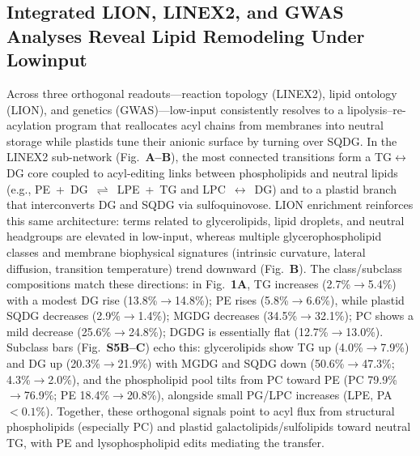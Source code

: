 \documentclass[10pt,letterpaper]{article}
\begin{document}
\subsection*{}




\subsection*{Integrated LION, LINEX2, and GWAS Analyses Reveal Lipid Remodeling Under Lowinput}

Across three orthogonal readouts—reaction topology (LINEX2), lipid ontology (LION), and genetics (GWAS)—low-input consistently resolves to a lipolysis–re-acylation program that reallocates acyl chains from membranes into neutral storage while plastids tune their anionic surface by turning over SQDG. In the LINEX2 sub-network (Fig.\ \textbf{A–B}), the most connected transitions form a TG$\leftrightarrow$DG core coupled to acyl-editing links between phospholipids and neutral lipids (e.g., \mbox{PE + DG $\rightleftharpoons$ LPE + TG} and \mbox{LPC $\leftrightarrow$ DG}) and to a plastid branch that interconverts DG and SQDG via sulfoquinovose. LION enrichment reinforces this same architecture: terms related to glycerolipids, lipid droplets, and neutral headgroups are elevated in low-input, whereas multiple glycerophospholipid classes and membrane biophysical signatures (intrinsic curvature, lateral diffusion, transition temperature) trend downward (Fig.\ \textbf{B}). The class/subclass compositions match these directions: in Fig.\ \textbf{1A}, TG increases (2.7\%$\rightarrow$5.4\%) with a modest DG rise (13.8\%$\rightarrow$14.8\%); PE rises (5.8\%$\rightarrow$6.6\%), while plastid SQDG decreases (2.9\%$\rightarrow$1.4\%); MGDG decreases (34.5\%$\rightarrow$32.1\%); PC shows a mild decrease (25.6\%$\rightarrow$24.8\%); DGDG is essentially flat (12.7\%$\rightarrow$13.0\%). Subclass bars (Fig.\ \textbf{S5B–C}) echo this: glycerolipids show TG up (4.0\%$\rightarrow$7.9\%) and DG up (20.3\%$\rightarrow$21.9\%) with MGDG and SQDG down (50.6\%$\rightarrow$47.3\%; 4.3\%$\rightarrow$2.0\%), and the phospholipid pool tilts from PC toward PE (PC 79.9\%$\rightarrow$76.9\%; PE 18.4\%$\rightarrow$20.8\%), alongside small PG/LPC increases (LPE, PA $<0.1\%$). Together, these orthogonal signals point to acyl flux from structural phospholipids (especially PC) and plastid galactolipids/sulfolipids toward neutral TG, with PE and lysophospholipid edits mediating the transfer.
\end{document}
